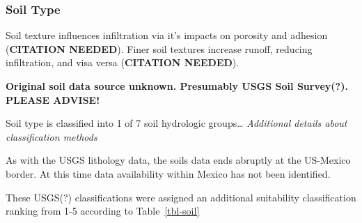 \documentclass[
]{agujournal2019}
\begin{document}
\subsubsection{Soil Type}\label{soil-type}

Soil texture influences infiltration via it's impacts on porosity and
adhesion (\textbf{CITATION NEEDED}). Finer soil textures increase
runoff, reducing infiltration, and visa versa (\textbf{CITATION
NEEDED}).

\textbf{Original soil data source unknown. Presumably USGS Soil
Survey(?). PLEASE ADVISE!}

Soil type is classified into 1 of 7 soil hydrologic groups\ldots{}
\emph{Additional details about classification methods}

As with the USGS lithology data, the soils data ends abruptly at the
US-Mexico border. At this time data availability within Mexico has not
been identified.

These USGS(?) classifications were assigned an additional suitability
classification ranking from 1-5 according to Table~\ref{tbl-soil}
\end{document}
